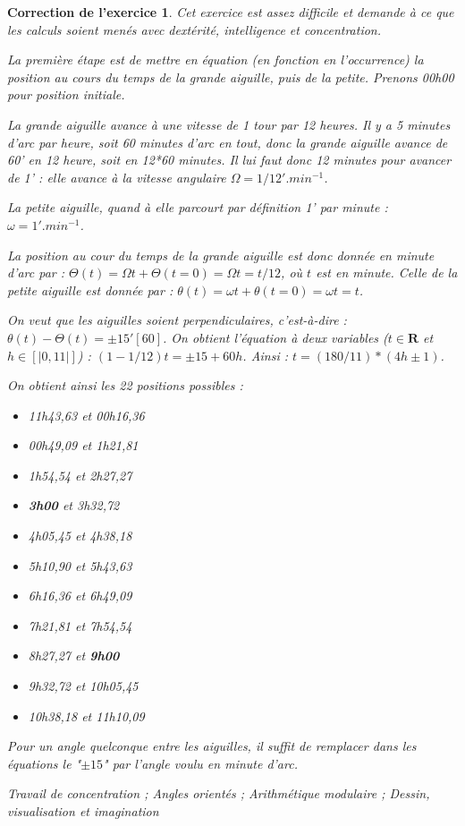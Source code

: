 \documentclass[12pt]{article}
\theoremstyle{break}
\newtheorem{cor}{Correction de l'exercice}
\begin{document}
\begin{cor}
Cet exercice est assez difficile et demande à ce que les calculs soient menés avec dextérité, intelligence et concentration.

La première étape est de mettre en équation (en fonction en l'occurrence) la position au cours du temps de la grande aiguille, puis de la petite. Prenons 00h00 pour position initiale.

La grande aiguille avance à une vitesse de 1 tour par 12 heures. Il y a 5 minutes d'arc par heure, soit 60 minutes d'arc en tout, donc la grande aiguille avance de 60' en 12 heure, soit en 12*60 minutes. Il lui faut donc 12 minutes pour avancer de 1' : elle avance à la vitesse angulaire $\Omega = 1/12 '.min^{-1}$.

La petite aiguille, quand à elle parcourt par définition 1' par minute : $\omega = 1 '.min^{-1}$.

La position au cour du temps de la grande aiguille est donc donnée en minute d'arc par : $\Theta(t) = \Omega t + \Theta(t=0) = \Omega t = t/12$, où $t$ est en minute. Celle de la petite aiguille est donnée par : $\theta(t) = \omega t + \theta(t=0) = \omega t = t$.

On veut que les aiguilles soient perpendiculaires, c'est-à-dire : $\theta(t) - \Theta(t) = \pm 15' [60]$. On obtient l'équation à deux variables ($t \in \textbf{R}$ et $h \in [|0, 11|]$) : $(1-1/12) t = \pm 15 + 60h$. Ainsi : $t = (180/11) * (4 h \pm 1)$.

On obtient ainsi les 22 positions possibles :\begin{itemize}
\item 11h43,63 et 00h16,36 
\item 00h49,09 et 1h21,81
\item 1h54,54 et 2h27,27
\item \textbf{3h00} et 3h32,72
\item 4h05,45 et 4h38,18
\item 5h10,90 et 5h43,63
\item 6h16,36 et 6h49,09
\item 7h21,81 et 7h54,54
\item 8h27,27 et \textbf{9h00}
\item 9h32,72 et 10h05,45
\item 10h38,18 et 11h10,09
\end{itemize}

Pour un angle quelconque entre les aiguilles, il suffit de remplacer dans les équations le "$\pm 15$" par l'angle voulu en minute d'arc.\newline 

\textit{Travail de concentration ; Angles orientés ; Arithmétique modulaire ; Dessin, visualisation et imagination}
\end{cor}
\end{document}
